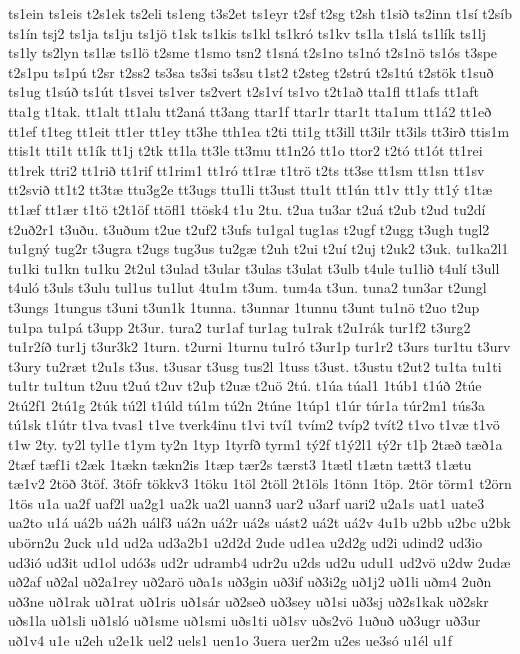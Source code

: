 {ts1ein
ts1eis
t2s1ek
ts2eli
ts1eng
t3s2et
ts1eyr
t2sf
t2sg
t2sh
t1sið
ts2inn
t1sí
t2síb
ts1ín
tsj2
ts1ja
ts1ju
ts1jö
t1sk
ts1kis
ts1kl
ts1kró
ts1kv
ts1la
t1slá
ts1lík
ts1lj
ts1ly
ts2lyn
ts1læ
ts1lö
t2sme
t1smo
tsn2
t1sná
t2s1no
ts1nó
t2s1nö
ts1ós
t3spe
t2s1pu
ts1pú
t2sr
t2ss2
ts3sa
ts3si
ts3su
t1st2
t2steg
t2strú
t2s1tú
t2stök
t1suð
ts1ug
t1súð
ts1út
t1svei
ts1ver
ts2vert
t2s1ví
ts1vo
t2t1að
tta1fl
tt1afs
tt1aft
tta1g
t1tak.
tt1alt
tt1alu
tt2aná
tt3ang
ttar1f
ttar1r
ttar1t
tta1um
tt1á2
tt1eð
tt1ef
t1teg
tt1eit
tt1er
tt1ey
tt3he
tth1ea
t2ti
tti1g
tt3ill
tt3ilr
tt3ils
tt3irð
ttis1m
ttis1t
tti1t
tt1ík
tt1j
t2tk
tt1la
tt3le
tt3mu
tt1n2ó
tt1o
ttor2
t2tó
tt1ót
tt1rei
tt1rek
ttri2
tt1rið
tt1rif
tt1rim1
tt1ró
tt1ræ
t1trö
t2ts
tt3se
tt1sm
tt1sn
tt1sv
tt2svið
tt1t2
tt3tæ
ttu3g2e
tt3ugs
ttu1li
tt3ust
ttu1t
tt1ún
tt1v
tt1y
tt1ý
t1tæ
tt1æf
tt1ær
t1tö
t2t1öf
ttöfl1
ttösk4
t1u
2tu.
t2ua
tu3ar
t2uá
t2ub
t2ud
tu2dí
t2uð2r1
t3uðu.
t3uðum
t2ue
t2uf2
t3ufs
tu1gal
tug1as
t2ugf
t2ugg
t3ugh
tugl2
tu1gný
tug2r
t3ugra
t2ugs
tug3us
tu2gæ
t2uh
t2ui
t2uí
t2uj
t2uk2
t3uk.
tu1ka2l1
tu1ki
tu1kn
tu1ku
2t2ul
t3ulad
t3ular
t3ulas
t3ulat
t3ulb
t4ule
tu1lið
t4ulí
t3ull
t4uló
t3uls
t3ulu
tul1us
tu1lut
4tu1m
t3um.
tum4a
t3un.
tuna2
tun3ar
t2ungl
t3ungs
1tungus
t3uni
t3un1k
1tunna.
t3unnar
1tunnu
t3unt
tu1nö
t2uo
t2up
tu1pa
tu1pá
t3upp
2t3ur.
tura2
tur1af
tur1ag
tu1rak
t2u1rák
tur1f2
t3urg2
tu1r2íð
tur1j
t3ur3k2
1turn.
t2urni
1turnu
tu1ró
t3ur1p
tur1r2
t3urs
tur1tu
t3urv
t3ury
tu2ræt
t2u1s
t3us.
t3usar
t3usg
tus2l
1tuss
t3ust.
t3ustu
t2ut2
tu1ta
tu1ti
tu1tr
tu1tun
t2uu
t2uú
t2uv
t2uþ
t2uæ
t2uö
2tú.
t1úa
túal1
1túb1
t1úð
2túe
2tú2f1
2tú1g
2túk
tú2l
t1úld
tú1m
tú2n
2túne
1túp1
t1úr
túr1a
túr2m1
tús3a
tú1sk
t1útr
t1va
tvas1
t1ve
tverk4inu
t1vi
tví1
tvím2
tvíp2
tvít2
t1vo
t1væ
t1vö
t1w
2ty.
ty2l
tyl1e
t1ym
ty2n
1typ
1tyrfð
tyrm1
tý2f
t1ý2l1
tý2r
t1þ
2tæð
tæð1a
2tæf
tæf1i
t2æk
1tækn
tækn2is
1tæp
tær2s
tærst3
1tætl
t1ætn
tætt3
t1ætu
tæ1v2
2töð
3töf.
3töfr
tökkv3
1töku
1töl
2töll
2t1öls
1tönn
1töp.
2tör
törm1
t2örn
1tös
u1a
ua2f
uaf2l
ua2g1
ua2k
ua2l
uann3
uar2
u3arf
uari2
u2a1s
uat1
uate3
ua2to
u1á
uá2b
uá2h
uálf3
uá2n
uá2r
uá2s
uást2
uá2t
uá2v
4u1b
u2bb
u2bc
u2bk
ubörn2u
2uck
u1d
ud2a
ud3a2b1
u2d2d
2ude
ud1ea
u2d2g
ud2i
udind2
ud3io
ud3ió
ud3it
ud1ol
udó3s
ud2r
udramb4
udr2u
u2ds
ud2u
udul1
ud2vö
u2dw
2udæ
uð2af
uð2al
uð2a1rey
uð2arö
uða1s
uð3gin
uð3if
uð3i2g
uð1j2
uð1li
uðm4
2uðn
uð3ne
uð1rak
uð1rat
uð1ris
uð1sár
uð2seð
uð3sey
uð1si
uð3sj
uð2s1kak
uð2skr
uðs1la
uð1sli
uð1sló
uð1sme
uð1smi
uðs1ti
uð1sv
uðs2vö
1uðuð
uð3ugr
uð3ur
uð1v4
u1e
u2eh
u2e1k
uel2
uels1
uen1o
3uera
uer2m
u2es
ue3só
u1él
u1f
}
